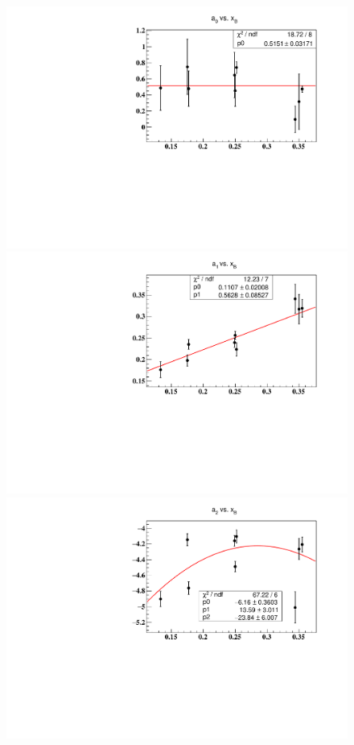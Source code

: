 \begin{figure}[tpb]
\includegraphics[scale=0.37]{fig_updated/test_a0.pdf}
\includegraphics[scale=0.37]{fig_updated/test_a1.pdf}
\includegraphics[scale=0.37]{fig_updated/test_a2.pdf}

\end{figure}
